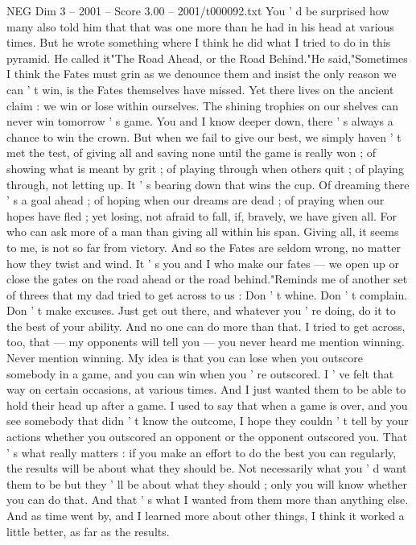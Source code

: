 \begin{textsample}{NEG Dim 3 – 2001 – Score 3.00 – 2001/t000092.txt}
You ' d be surprised how many also told him that that was one more than he had in his head at various times.
But he wrote something where I think he did what I tried to do in this pyramid.
He called it"The Road Ahead, or the Road Behind."He said,"Sometimes I think the Fates must grin as we denounce them and insist the only reason we can ' t win, is the Fates themselves have missed.
Yet there lives on the ancient claim : we win or lose within ourselves.
The shining trophies on our shelves can never win tomorrow ' s game.
You and I know deeper down, there ' s always a chance to win the crown.
But when we fail to give our best, we simply haven ' t met the test, of giving all and saving none until the game is really won ; of showing what is meant by grit ; of playing through when others quit ; of playing through, not letting up.
It ' s bearing down that wins the cup.
Of dreaming there ' s a goal ahead ; of hoping when our dreams are dead ; of praying when our hopes have fled ; yet losing, not afraid to fall, if, bravely, we have given all.
For who can ask more of a man than giving all within his span.
Giving all, it seems to me, is not so far from victory.
And so the Fates are seldom wrong, no matter how they twist and wind.
It ' s you and I who make our fates — we open up or close the gates on the road ahead or the road behind."Reminds me of another set of threes that my dad tried to get across to us : Don ' t whine.
Don ' t complain.
Don ' t make excuses.
Just get out there, and whatever you ' re doing, do it to the best of your ability.
And no one can do more than that.
I tried to get across, too, that — my opponents will tell you — you never heard me mention winning.
Never mention winning.
My idea is that you can lose when you outscore somebody in a game, and you can win when you ' re outscored.
I ' ve felt that way on certain occasions, at various times.
And I just wanted them to be able to hold their head up after a game.
I used to say that when a game is over, and you see somebody that didn ' t know the outcome, I hope they couldn ' t tell by your actions whether you outscored an opponent or the opponent outscored you.
That ' s what really matters : if you make an effort to do the best you can regularly, the results will be about what they should be.
Not necessarily what you ' d want them to be but they ' ll be about what they should ; only you will know whether you can do that.
And that ' s what I wanted from them more than anything else.
And as time went by, and I learned more about other things, I think it worked a little better, as far as the results.

\end{textsample}
